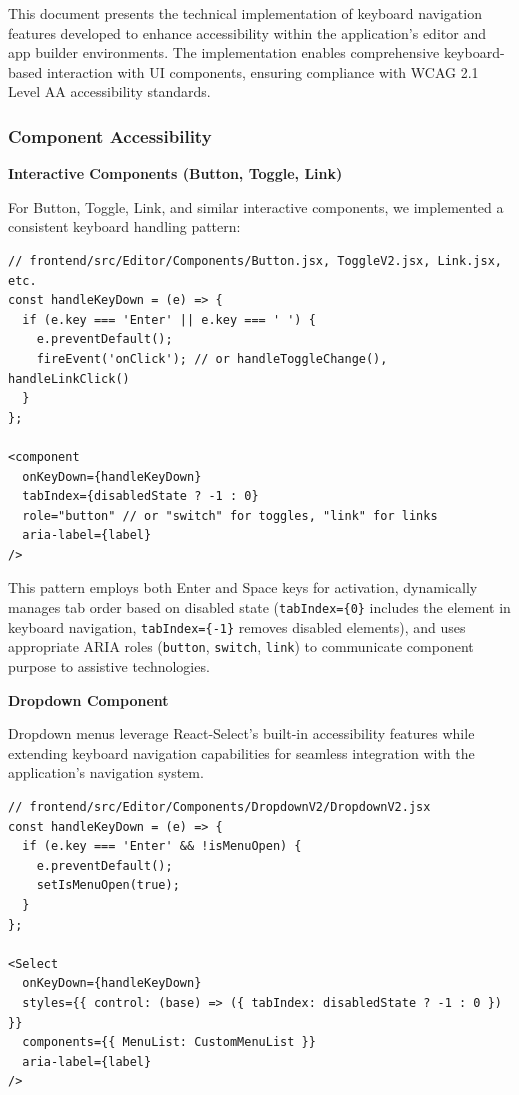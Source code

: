
This document presents the technical implementation of keyboard navigation features developed to enhance accessibility within the application's editor and app builder environments. The implementation enables comprehensive keyboard-based interaction with UI components, ensuring compliance with WCAG 2.1 Level AA accessibility standards.

\subsubsection{Component Accessibility}

\textbf{Interactive Components (Button, Toggle, Link)}

For Button, Toggle, Link, and similar interactive components, we implemented a consistent keyboard handling pattern:

\begin{lstlisting}[caption=Interactive Components Keyboard Pattern, label=lst:button-toggle-link-focus]
// frontend/src/Editor/Components/Button.jsx, ToggleV2.jsx, Link.jsx, etc.
const handleKeyDown = (e) => {
  if (e.key === 'Enter' || e.key === ' ') {
    e.preventDefault();
    fireEvent('onClick'); // or handleToggleChange(), handleLinkClick()
  }
};

<component
  onKeyDown={handleKeyDown}
  tabIndex={disabledState ? -1 : 0}
  role="button" // or "switch" for toggles, "link" for links
  aria-label={label}
/>
\end{lstlisting}

This pattern employs both Enter and Space keys for activation, dynamically manages tab order based on disabled state (\texttt{tabIndex=\{0\}} includes the element in keyboard navigation, \texttt{tabIndex=\{-1\}} removes disabled elements), and uses appropriate ARIA roles (\texttt{button}, \texttt{switch}, \texttt{link}) to communicate component purpose to assistive technologies.

\textbf{Dropdown Component}

Dropdown menus leverage React-Select's built-in accessibility features while extending keyboard navigation capabilities for seamless integration with the application's navigation system.

\begin{lstlisting}[caption=Dropdown Keyboard Support, label=lst:dropdown-focus]
// frontend/src/Editor/Components/DropdownV2/DropdownV2.jsx
const handleKeyDown = (e) => {
  if (e.key === 'Enter' && !isMenuOpen) {
    e.preventDefault();
    setIsMenuOpen(true);
  }
};

<Select
  onKeyDown={handleKeyDown}
  styles={{ control: (base) => ({ tabIndex: disabledState ? -1 : 0 }) }}
  components={{ MenuList: CustomMenuList }}
  aria-label={label}
/>
\end{lstlisting}

